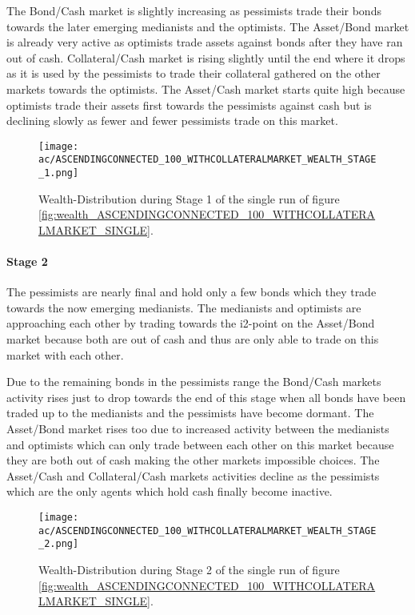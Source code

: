 \documentclass[Bachelorarbeit.tex]{subfiles}
\begin{document}
\medskip
The Bond/Cash market is slightly increasing as pessimists trade their bonds towards the later emerging medianists and the optimists. The Asset/Bond market is already very active as optimists trade assets against bonds after they have ran out of cash. Collateral/Cash market is rising slightly until the end where it drops as it is used by the pessimists to trade their collateral gathered on the other markets towards the optimists. The Asset/Cash market starts quite high because optimists trade their assets first towards the pessimists against cash but is declining slowly as fewer and fewer pessimists trade on this market.

\begin{figure}[H]
	\centering
  \texttt{[image: ac/ASCENDINGCONNECTED\_100\_WITHCOLLATERALMARKET\_WEALTH\_STAGE\_1.png]}
  	\caption{Wealth-Distribution during Stage 1 of the single run of figure \ref{fig:wealth_ASCENDINGCONNECTED_100_WITHCOLLATERALMARKET_SINGLE}.}
	\label{fig:wealth_ASCENDINGCONNECTED_100_WITHCOLLATERALMARKET_WEALTH_STAGE_1}
\end{figure}

\paragraph{Stage 2}
The pessimists are nearly final and hold only a few bonds which they trade towards the now emerging medianists. The medianists and optimists are approaching each other by trading towards the i2-point on the Asset/Bond market because both are out of cash and thus are only able to trade on this market with each other.

\medskip
Due to the remaining bonds in the pessimists range the Bond/Cash markets activity rises just to drop towards the end of this stage when all bonds have been traded up to the medianists and the pessimists have become dormant. The Asset/Bond market rises too due to increased activity between the medianists and optimists which can only trade between each other on this market because they are both out of cash making the other markets impossible choices. The Asset/Cash and Collateral/Cash markets activities decline as the pessimists which are the only agents which hold cash finally become inactive.

\begin{figure}[H]
	\centering
  \texttt{[image: ac/ASCENDINGCONNECTED\_100\_WITHCOLLATERALMARKET\_WEALTH\_STAGE\_2.png]}
  	\caption{Wealth-Distribution during Stage 2 of the single run of figure \ref{fig:wealth_ASCENDINGCONNECTED_100_WITHCOLLATERALMARKET_SINGLE}.}
	\label{fig:wealth_ASCENDINGCONNECTED_100_WITHCOLLATERALMARKET_WEALTH_STAGE_2}
\end{figure}
\end{document}

